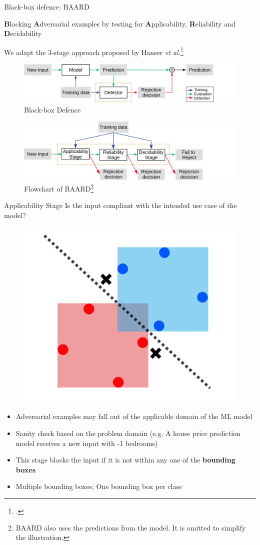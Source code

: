 \documentclass[9pt]{beamer}
\begin{document}
\begin{frame}{Black-box defence: BAARD}
\label{blackbox_defence}

\textbf{B}locking \textbf{A}dversarial examples by testing for \textbf{A}pplicability, \textbf{R}eliability and \textbf{D}ecidability

We adapt the 3-stage approach proposed by Hanser {\em et al.}\footcite{hanser2016applicability}

\begin{figure}[h!]
    \centering
    \scriptsize
    \includegraphics[width=0.73\linewidth]{images/black-box-defence_2.pdf}
    \caption{Black-box Defence}
\end{figure}

\begin{figure}
    \centering
    \scriptsize
    \includegraphics[width=0.73\linewidth]{images/baard_2.pdf}
    \caption{Flowchart of BAARD\footnote{BAARD also uses the predictions from the model. It is omitted to simplify the illustration.}}
\end{figure}
\end{frame}

\begin{frame}{Applicability Stage}
Is the input compliant with the intended use case of the model?
\begin{figure}
    \centering
    \includegraphics[width=0.35\linewidth]{images/applicability.png}
\end{figure}

\begin{itemize}
    \item Adversarial examples may fall out of the applicable domain of the ML model
    \item Sanity check based on the problem domain (e.g. A house price prediction model receives a new input with -1 bedrooms)
    \item This stage blocks the input if it is not within any one of the \textbf{bounding boxes}
    \item Multiple bounding boxes; One bounding box per class
\end{itemize}

\end{frame}
\end{document}
